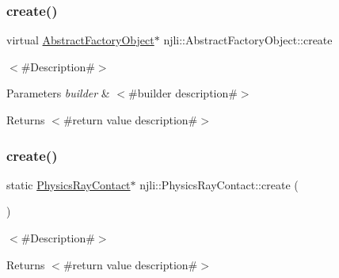 \subsubsection{\texorpdfstring{create()}{create()}\hspace{0.1cm}{\footnotesize\ttfamily [1/3]}}
{\footnotesize\ttfamily virtual \mbox{\hyperlink{classnjli_1_1_abstract_factory_object}{Abstract\+Factory\+Object}}$\ast$ njli\+::\+Abstract\+Factory\+Object\+::create}

$<$\#\+Description\#$>$


\begin{DoxyParams}{Parameters}
{\em builder} & $<$\#builder description\#$>$\\
\hline
\end{DoxyParams}
\begin{DoxyReturn}{Returns}
$<$\#return value description\#$>$ 
\end{DoxyReturn}
\mbox{\label{classnjli_1_1_physics_ray_contact_af2363fea4145cacad545b63386c2b071}} 
\subsubsection{\texorpdfstring{create()}{create()}\hspace{0.1cm}{\footnotesize\ttfamily [2/3]}}
{\footnotesize\ttfamily static \mbox{\hyperlink{classnjli_1_1_physics_ray_contact}{Physics\+Ray\+Contact}}$\ast$ njli\+::\+Physics\+Ray\+Contact\+::create (\begin{DoxyParamCaption}{ }\end{DoxyParamCaption})\hspace{0.3cm}{\ttfamily [static]}}

$<$\#\+Description\#$>$

\begin{DoxyReturn}{Returns}
$<$\#return value description\#$>$ 
\end{DoxyReturn}
\mbox{\label{classnjli_1_1_physics_ray_contact_a44731e003241a785dbdb45ae94531c61}} 
